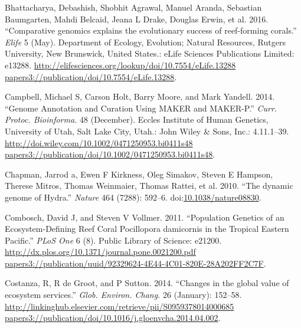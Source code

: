 \documentclass[]{elsarticle} %
\begin{document}
\hypertarget{ref-Bhattacharya2016}{}
Bhattacharya, Debashish, Shobhit Agrawal, Manuel Aranda, Sebastian
Baumgarten, Mahdi Belcaid, Jeana L Drake, Douglas Erwin, et al. 2016.
``Comparative genomics explains the evolutionary success of reef-forming
corals.'' \emph{Elife} 5 (May). Department of Ecology, Evolution;
Natural Resources, Rutgers University, New Brunswick, United States.:
eLife Sciences Publications Limited: e13288.
\href{http://elifesciences.org/lookup/doi/10.7554/eLife.13288\%20papers3://publication/doi/10.7554/eLife.13288}{http://elifesciences.org/lookup/doi/10.7554/eLife.13288 papers3://publication/doi/10.7554/eLife.13288}.

\hypertarget{ref-Campbell2014}{}
Campbell, Michael S, Carson Holt, Barry Moore, and Mark Yandell. 2014.
``Genome Annotation and Curation Using MAKER and MAKER-P.'' \emph{Curr.
Protoc. Bioinforma.} 48 (December). Eccles Institute of Human Genetics,
University of Utah, Salt Lake City, Utah.: John Wiley \& Sons, Inc.:
4.11.1--39.
\href{http://doi.wiley.com/10.1002/0471250953.bi0411s48\%20papers3://publication/doi/10.1002/0471250953.bi0411s48}{http://doi.wiley.com/10.1002/0471250953.bi0411s48 papers3://publication/doi/10.1002/0471250953.bi0411s48}.

\hypertarget{ref-Chapman2010}{}
Chapman, Jarrod a, Ewen F Kirkness, Oleg Simakov, Steven E Hampson,
Therese Mitros, Thomas Weinmaier, Thomas Rattei, et al. 2010. ``The
dynamic genome of Hydra.'' \emph{Nature} 464 (7288): 592--6.
doi:\href{https://doi.org/10.1038/nature08830}{10.1038/nature08830}.

\hypertarget{ref-Combosch2011}{}
Combosch, David J, and Steven V Vollmer. 2011. ``Population Genetics of
an Ecosystem-Defining Reef Coral Pocillopora damicornis in the Tropical
Eastern Pacific.'' \emph{PLoS One} 6 (8). Public Library of Science:
e21200.
\href{http://dx.plos.org/10.1371/journal.pone.0021200.pdf\%20papers3://publication/uuid/92329624-4E44-4C01-820E-28A202FF2C7F}{http://dx.plos.org/10.1371/journal.pone.0021200.pdf papers3://publication/uuid/92329624-4E44-4C01-820E-28A202FF2C7F}.

\hypertarget{ref-Costanza2014}{}
Costanza, R, R de Groot, and P Sutton. 2014. ``Changes in the global
value of ecosystem services.'' \emph{Glob. Environ. Chang.} 26
(January): 152--58.
\href{http://linkinghub.elsevier.com/retrieve/pii/S0959378014000685\%20papers3://publication/doi/10.1016/j.gloenvcha.2014.04.002}{http://linkinghub.elsevier.com/retrieve/pii/S0959378014000685 papers3://publication/doi/10.1016/j.gloenvcha.2014.04.002}.
\end{document}
